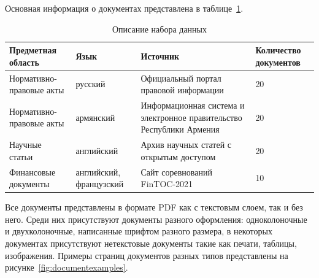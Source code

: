 Основная информация о документах представлена в таблице~\ref{tab:dataset}.
\begin{table}
    \begin{center}
        \begin{tabular}{|p{4cm}|p{3cm}|p{5cm}|p{2.5cm}|}
            \hline
            \textbf{Предметная область} & \textbf{Язык} & \textbf{Источник} & \textbf{Количество документов} \\
            \hline
            \hline
            Нормативно-правовые акты & русский & Официальный портал правовой информации\tablefootnote{\url{http://publication.pravo.gov.ru/}} & 20 \\
            \hline
            Нормативно-правовые акты & армянский & Информационная система\tablefootnote{\url{https://www.arlis.am/}} и электронное правительство\tablefootnote{\url{https://www.e-gov.am/en/}} Республики Армения & 20 \\
            \hline
            Научные статьи & английский & Архив научных статей с открытым доступом\tablefootnote{\url{https://arxiv.org/}} & 20 \\
            \hline
            Финансовые документы & английский, французский & Сайт соревнований FinTOC-2021\tablefootnote{\url{http://wp.lancs.ac.uk/cfie/fintoc2021/}} & 10 \\
            \hline
        \end{tabular}
    \end{center}
    \caption{Описание набора данных}
    \label{tab:dataset}
\end{table}

Все документы представлены в формате PDF как с текстовым слоем, так и без него.
Среди них присутствуют документы разного оформления: одноколоночные и двухколоночные, написанные шрифтом разного размера, в некоторых документах присутствуют нетекстовые документы такие как печати, таблицы, изображения.
Примеры страниц документов разных типов представлены на рисунке~\ref{fig:documentexamples}.

